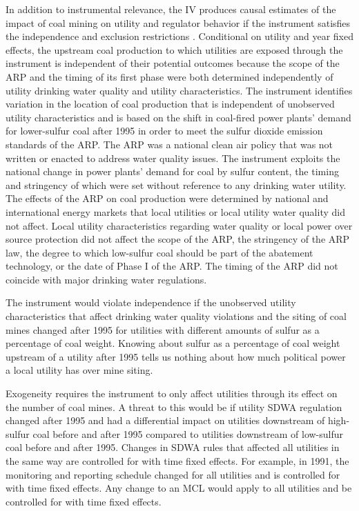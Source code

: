 \documentclass[12pt]{article}
\begin{document}
In addition to instrumental relevance, the IV produces causal estimates of the impact of coal mining on utility and regulator behavior if the instrument satisfies the independence and exclusion restrictions \parencite{angrist2009mostly}. Conditional on utility and year fixed effects, the upstream coal production to which utilities are exposed through the instrument is independent of their potential outcomes because the scope of the ARP and the timing of its first phase were both determined independently of utility drinking water quality and utility characteristics. The instrument identifies variation in the location of coal production that is independent of unobserved utility characteristics and is based on the shift in coal-fired power plants' demand for lower-sulfur coal after 1995 in order to meet the sulfur dioxide emission standards of the ARP. The ARP was a national clean air policy that was not written or enacted to address water quality issues. The instrument exploits the national change in power plants' demand for coal by sulfur content, the timing and stringency of which were set without reference to any drinking water utility. The effects of the ARP on coal production were determined by national and international energy markets that local utilities or local utility water quality did not affect. Local utility characteristics regarding water quality or local power over source protection did not affect the scope of the ARP, the stringency of the ARP law, the degree to which low-sulfur coal should be part of the abatement technology, or the date of Phase I of the ARP. The timing of the ARP did not coincide with major drinking water regulations.

The instrument would violate independence if the unobserved utility characteristics that affect drinking water quality violations and the siting of coal mines changed after 1995 for utilities with different amounts of sulfur as a percentage of coal weight. Knowing about sulfur as a percentage of coal weight upstream of a utility after 1995 tells us nothing about how much political power a local utility has over mine siting.

Exogeneity requires the instrument to only affect utilities through its effect on the number of coal mines. A threat to this would be if utility SDWA regulation changed after 1995 and had a differential impact on utilities downstream of high-sulfur coal before and after 1995 compared to utilities downstream of low-sulfur coal before and after 1995. Changes in SDWA rules that affected all utilities in the same way are controlled for with time fixed effects. For example, in 1991, the monitoring and reporting schedule changed for all utilities and is controlled for with time fixed effects. Any change to an MCL would apply to all utilities and be controlled for with time fixed effects. 
\end{document}
